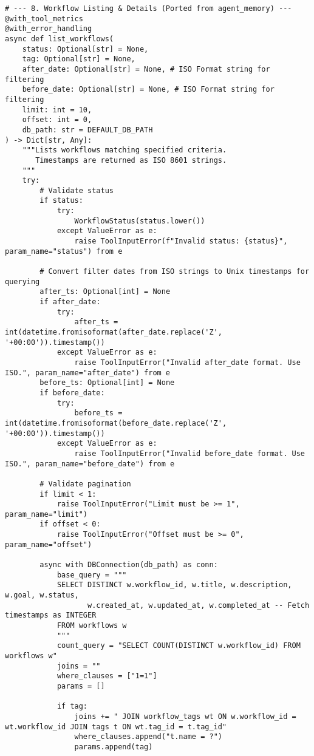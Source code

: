 \documentclass[12pt,a4paper]{article}
\begin{document}
\begin{pageablecode}
\begin{verbatim}
# --- 8. Workflow Listing & Details (Ported from agent_memory) ---
@with_tool_metrics
@with_error_handling
async def list_workflows(
    status: Optional[str] = None,
    tag: Optional[str] = None,
    after_date: Optional[str] = None, # ISO Format string for filtering
    before_date: Optional[str] = None, # ISO Format string for filtering
    limit: int = 10,
    offset: int = 0,
    db_path: str = DEFAULT_DB_PATH
) -> Dict[str, Any]:
    """Lists workflows matching specified criteria.
       Timestamps are returned as ISO 8601 strings.
    """
    try:
        # Validate status
        if status:
            try: 
                WorkflowStatus(status.lower())
            except ValueError as e: 
                raise ToolInputError(f"Invalid status: {status}", param_name="status") from e

        # Convert filter dates from ISO strings to Unix timestamps for querying
        after_ts: Optional[int] = None
        if after_date:
            try: 
                after_ts = int(datetime.fromisoformat(after_date.replace('Z', '+00:00')).timestamp())
            except ValueError as e: 
                raise ToolInputError("Invalid after_date format. Use ISO.", param_name="after_date") from e
        before_ts: Optional[int] = None
        if before_date:
            try: 
                before_ts = int(datetime.fromisoformat(before_date.replace('Z', '+00:00')).timestamp())
            except ValueError as e: 
                raise ToolInputError("Invalid before_date format. Use ISO.", param_name="before_date") from e

        # Validate pagination
        if limit < 1: 
            raise ToolInputError("Limit must be >= 1", param_name="limit")
        if offset < 0: 
            raise ToolInputError("Offset must be >= 0", param_name="offset")

        async with DBConnection(db_path) as conn:
            base_query = """
            SELECT DISTINCT w.workflow_id, w.title, w.description, w.goal, w.status,
                   w.created_at, w.updated_at, w.completed_at -- Fetch timestamps as INTEGER
            FROM workflows w
            """
            count_query = "SELECT COUNT(DISTINCT w.workflow_id) FROM workflows w"
            joins = ""
            where_clauses = ["1=1"]
            params = []

            if tag:
                joins += " JOIN workflow_tags wt ON w.workflow_id = wt.workflow_id JOIN tags t ON wt.tag_id = t.tag_id"
                where_clauses.append("t.name = ?")
                params.append(tag)


\end{verbatim}
\end{pageablecode}
\end{document}
